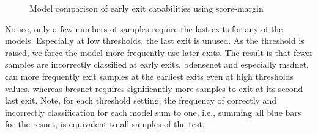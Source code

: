 \begin{minipage}{\linewidth}
\begin{figure}
		\hfill
		\hfill
		\hfill
		\hfill
		
		\caption[Model comparison of early exit capabilities]{Model comparison of early exit capabilities using score-margin}
		\label{fig:model_threshold_comparison}
	\end{figure}
	
\end{minipage}

Notice, only a few numbers of samples require the last exits for any of the models. Especially at low thresholds, the last exit is unused. As the threshold is raised, we force the model more frequently use later exits. The result is that fewer samples are incorrectly classified at early exits. \gls{bdensenet} and especially \gls{msdnet}, can more frequently exit samples at the earliest exits even at high thresholds values, whereas \gls{bresnet} requires significantly more samples to exit at its second last exit.
Note, for each threshold setting, the frequency of correctly and incorrectly classification for each model sum to one, i.e., summing all blue bars for the \gls{resnet}, is equivalent to all samples of the test.


